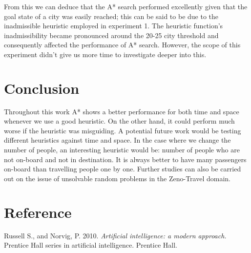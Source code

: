 \documentclass[letterpaper]{article}
\begin{document}
From this we can deduce that the A* search performed excellently given that the goal state of a city
was easily reached; this can be said to be due to the inadmissible heuristic employed in experiment 1. The heuristic function's inadmissibility became pronounced around the 20-25 city threshold and consequently affected the performance of A* search. However, the scope of this experiment didn't give us more
time to investigate deeper into this.


\section{Conclusion}
Throughout this work A* shows a better performance for both time and space whenever we use a good heuristic. On the other hand, it
could perform much worse if the heuristic was misguiding.
A potential future work would be testing different heuristics against time and space. In the case where we change the number of people, an
interesting heuristic would be: number of people who are not on-board and not in destination. It is always better to have many
passengers on-board than travelling people one by one.
Further studies can also be carried out on the issue of unsolvable random problems in the Zeno-Travel domain.

\section{Reference}
Russell S., and Norvig, P. 2010. \textit{Artificial intelligence: a modern approach.} Prentice Hall series in artificial intelligence. Prentice Hall.
\end{document}
